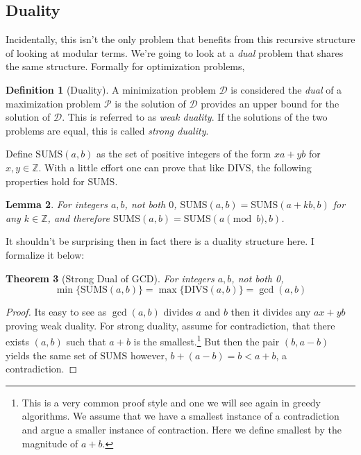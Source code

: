 \documentclass[11pt]{article}
\theoremstyle{plain}
\newtheorem{thm}{Theorem}[section] %
\newtheorem{lem}[thm]{Lemma}
\theoremstyle{definition}
\newtheorem{defn}[thm]{Definition} %
\newcommand{\ZZ}{\mathbb{Z}}
\numberwithin{equation}{section}
\numberwithin{figure}{section}
\begin{document}
\subsection{Duality}

\noindent Incidentally, this isn't the only problem that benefits from this recursive structure of looking at modular terms. We're going to look at a \emph{dual} problem that shares the same structure. Formally for optimization problems,

\begin{framed}
\begin{defn}[Duality]
A minimization problem $\mathcal{D}$ is considered the \emph{dual} of a maximization problem $\mathcal{P}$ is the solution of $\mathcal{D}$ provides an upper bound for the solution of $\mathcal{D}$. This is referred to as \emph{weak duality}. If the solutions of the two problems are equal, this is called \emph{strong duality}.
\end{defn}
\end{framed}

\noindent Define $\mathrm{SUMS}(a,b)$ as the set of positive integers of the form $xa + yb$ for $x, y \in \ZZ$. With a little effort one can prove that like $\mathrm{DIVS}$, the following properties hold for $\mathrm{SUMS}$.

\begin{lem}
For integers $a,b$, not both $0$, $\mathrm{SUMS}(a,b) = \mathrm{SUMS}(a + kb, b)$ for any $k \in \ZZ$, and therefore $\mathrm{SUMS}(a,b) = \mathrm{SUMS}(a \pmod b, b)$. 
\end{lem}

\noindent It shouldn't be surprising then in fact there is a duality structure here. I formalize it below:

\begin{thm}[Strong Dual of GCD]
For integers $a, b$, not both 0, 
\begin{equation}
\min \{\mathrm{SUMS}(a,b) \} = \max \{ \mathrm{DIVS}(a,b)\} = \gcd(a,b)
\end{equation}
\end{thm}

\begin{proof}
Its easy to see as $\gcd(a,b)$ divides $a$ and $b$ then it divides any $ax + yb$ proving weak duality. For strong duality, assume for contradiction, that there exists $(a,b)$ such that $a + b$ is the smallest.\footnote{This is a very common proof style and one we will see again in greedy algorithms. We assume that we have a smallest instance of a contradiction and argue a smaller instance of contraction. Here we define smallest by the magnitude of $a + b$.} But then the pair $(b, a - b)$ yields the same set of $\mathrm{SUMS}$ however, $b + (a - b) = b < a + b$, a contradiction.
\end{proof}
\end{document}
